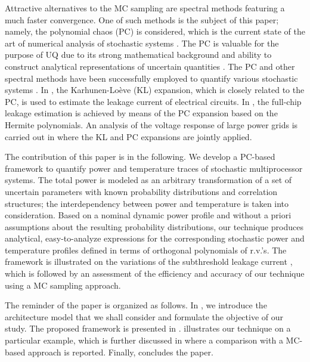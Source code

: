 Attractive alternatives to the MC sampling are spectral methods \cite{maitre2010, ghanem1991, xiu2010} featuring a much faster convergence. One of such methods is the subject of this paper; namely, the polynomial chaos (PC) is considered, which is the current state of the art of numerical analysis of stochastic systems \cite{xiu2009}. The PC is valuable for the purpose of UQ due to its strong mathematical background and ability to construct analytical representations of uncertain quantities \cite{eldred2009}. The PC and other spectral methods have been successfully employed to quantify various stochastic systems \cite{xiu2010}. In \cite{bhardwaj2006}, the Karhunen-Lo\`{e}ve (KL) expansion, which is closely related to the PC, is used to estimate the leakage current of electrical circuits. In \cite{shen2009}, the full-chip leakage estimation is achieved by means of the PC expansion based on the Hermite polynomials. An analysis of the voltage response of large power grids is carried out in \cite{ghanta2006} where the KL and PC expansions are jointly applied.

The contribution of this paper is in the following. We develop a PC-based framework to quantify power and temperature traces of stochastic multiprocessor systems. The total power is modeled as an arbitrary transformation of a set of uncertain parameters with known probability distributions and correlation structures; the interdependency between power and temperature is taken into consideration. Based on a nominal dynamic power profile and without a priori assumptions about the resulting probability distributions, our technique produces analytical, easy-to-analyze expressions for the corresponding stochastic power and temperature profiles defined in terms of orthogonal polynomials of r.v.'s. The framework is illustrated on the variations of the subthreshold leakage current \cite{srivastava2010}, which is followed by an assessment of the efficiency and accuracy of our technique using a MC sampling approach.

The reminder of the paper is organized as follows. In , we introduce the architecture model that we shall consider and formulate the objective of our study. The proposed framework is presented in .  illustrates our technique on a particular example, which is further discussed in  where a comparison with a MC-based approach is reported. Finally,  concludes the paper.
